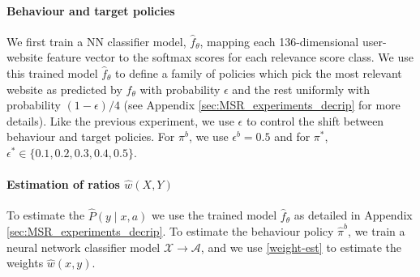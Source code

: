 \paragraph{Behaviour and target policies} 
We first train a NN classifier model, $\hat{f}_\theta$, mapping each 136-dimensional user-website feature vector to the softmax scores for each relevance score class. We use this trained model $\hat{f}_\theta$ to define a family of policies which pick the most relevant website as predicted by $\hat{f}_\theta$ with probability $\epsilon$ and the rest uniformly with probability $(1-\epsilon)/4$ (see Appendix \ref{sec:MSR_experiments_decrip} for more details). Like the previous experiment, we use $\epsilon$ to control the shift between behaviour and target policies. For $\pi^b$, we use $\epsilon^b = 0.5$ and for $\pi^*$, $\epsilon^* \in \{0.1, 0.2, 0.3, 0.4, 0.5\}$. 

\paragraph{Estimation of ratios $\hat{w}(X, Y)$}
To estimate the $\hat{P}(y \mid x, a)$ we use the trained model $\hat{f}_\theta$ as detailed in Appendix \ref{sec:MSR_experiments_decrip}. To estimate the behaviour policy $\hat{\pi}^b$, we train a neural network classifier model $\mathcal{X} \rightarrow \mathcal{A}$, and we use \eqref{weight-est} to estimate the weights $\hat{w}(x, y)$.

